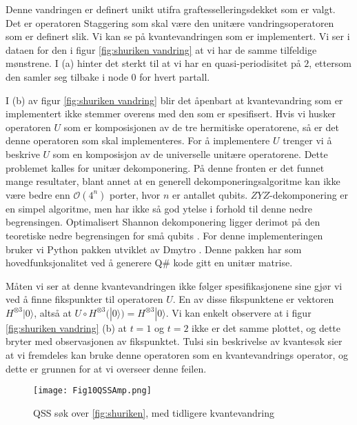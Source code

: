             Denne vandringen er definert unikt utifra graftesselleringsdekket som er valgt. Det er operatoren Staggering som skal være den unitære vandringsoperatoren som er definert slik. Vi kan se på kvantevandringen som er implementert. Vi ser i dataen for den i figur \ref{fig:shuriken vandring} at vi har de samme tilfeldige mønstrene. I (a) hinter det sterkt til at vi har en quasi-periodisitet på $2$, ettersom den samler seg tilbake i node 0 for hvert partall.

            I (b) av figur \ref{fig:shuriken vandring} blir det åpenbart at kvantevandring som er implementert ikke stemmer overens med den som er spesifisert. Hvis vi husker operatoren $U$ som er komposisjonen av de tre hermitiske operatorene, så er det denne operatoren som skal implementeres. For å implementere $U$ trenger vi å beskrive $U$ som en komposisjon av de universelle unitære operatorene. Dette problemet kalles for unitær dekomponering. På denne fronten er det funnet mange resultater, blant annet at en generell dekomponeringsalgoritme kan ikke være bedre enn $\mathcal{O}(4^n)$ porter, hvor $n$ er antallet qubits. $ZYZ$-dekomponering er en simpel algoritme, men har ikke så god ytelse i forhold til denne nedre begrensingen. Optimalisert Shannon dekomponering ligger derimot på den teoretiske nedre begrensingen for små qubits \cite{krol2021efficient}. For denne implementeringen bruker vi Python pakken utviklet av Dmytro \cite{article}. Denne pakken har som hovedfunksjonalitet ved å generere Q\# kode gitt en unitær matrise.

            Måten vi ser at denne kvantevandringen ikke følger spesifikasjonene sine gjør vi ved å finne fikspunkter til operatoren $U$. En av disse fikspunktene er vektoren $H^{\otimes 3}|0\rangle$, altså at $U\circ H^{\otimes 3}(|0\rangle)=H^{\otimes 3}|0\rangle$. Vi kan enkelt observere at i figur \ref{fig:shuriken vandring} (b) at $t=1$ og $t=2$ ikke er det samme plottet, og dette bryter med observasjonen av fikspunktet. Tulsi sin beskrivelse av kvantesøk \cite{PhysRevA.86.042331} sier at vi fremdeles kan bruke denne operatoren som en kvantevandrings operator, og dette er grunnen for at vi overseer denne feilen.



            \begin{figure}
                \begin{center}
                    \caption{QSS søk over \ref{fig:shuriken}, med tidligere kvantevandring}
                    \texttt{[image: Fig10QSSAmp.png]}
                    \label{fig:QSS}
                \end{center}
            \end{figure}
        
